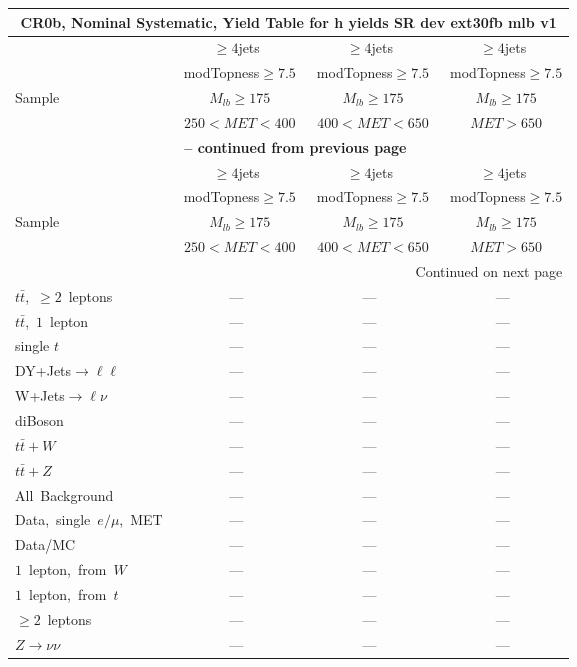 \documentclass{article}
\begin{document}
\begin{longtable}{|l|c|c|c|} 
 
\multicolumn{4}{c}{ CR0b, Nominal Systematic, Yield Table for h yields SR dev ext30fb mlb v1 }\\* \hline 
  & $\ge4$jets  & $\ge4$jets  & $\ge4$jets \\* 
  & ~modTopness$\ge7.5$  & ~modTopness$\ge7.5$  & ~modTopness$\ge7.5$ \\* 
Sample  & ~$M_{lb}\ge175$  & ~$M_{lb}\ge175$  & ~$M_{lb}\ge175$ \\* 
  & ~$250<MET<400$  & ~$400<MET<650$  & ~$MET>650$ \\* 
\hline \hline 
\endfirsthead 
 
\multicolumn{4}{c}{{\bfseries \tablename\ \thetable{} -- continued from previous page}}\\* \hline 
  & $\ge4$jets  & $\ge4$jets  & $\ge4$jets \\* 
  & ~modTopness$\ge7.5$  & ~modTopness$\ge7.5$  & ~modTopness$\ge7.5$ \\* 
Sample  & ~$M_{lb}\ge175$  & ~$M_{lb}\ge175$  & ~$M_{lb}\ge175$ \\* 
  & ~$250<MET<400$  & ~$400<MET<650$  & ~$MET>650$ \\* 
\hline \hline 
\endhead 
 
\multicolumn{4}{|r|}{{Continued on next page}}\\* \hline 
\endfoot 
 
 
\endlastfoot 
 
$t\bar{t}$,~$\ge2$~leptons & ---  & ---  & --- \\* 
$t\bar{t}$,~$1$~lepton & ---  & ---  & --- \\* 
single $t$  & ---  & ---  & --- \\* 
DY+Jets$\rightarrow\ell\ell$  & ---  & ---  & --- \\* 
W+Jets$\rightarrow\ell\nu$  & ---  & ---  & --- \\* 
diBoson  & ---  & ---  & --- \\* 
$t\bar{t}+W$  & ---  & ---  & --- \\* 
$t\bar{t}+Z$  & ---  & ---  & --- \\* 
\hline \hline 
All~Background  & ---  & ---  & --- \\* 
Data,~single~$e/\mu$,~MET  & ---  & ---  & --- \\* 
Data/MC  & ---  & ---  & --- \\* 
\hline \hline 
$1$~lepton,~from~$W$  & ---  & ---  & --- \\* 
$1$~lepton,~from~$t$  & ---  & ---  & --- \\* 
$\ge2$~leptons  & ---  & ---  & --- \\* 
$Z\rightarrow\nu\nu$  & ---  & ---  & --- \\* 
\hline 
\end{longtable} 
\end{document}
